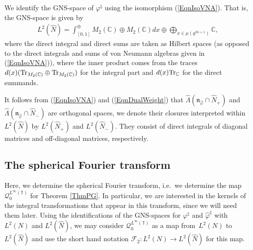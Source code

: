 \documentclass[pdftex]{sigma}
\numberwithin{equation}{section}
\theoremstyle{definition}
\begin{document}
 We identify the GNS-space of $\varphi^\natural$ using the isomorphism (\ref{EqnIsoVNA}). That is, the GNS-space is given by
\begin{gather*}
L^2(\hat{N}) = \int_{[0,1]}^\oplus M_2(\mathbb{C}) \oplus M_2(\mathbb{C})  dx \oplus \bigoplus_{x \in \mu(q^{2\mathbb{N}+1})} \mathbb{C},
\end{gather*}
where the direct integral and direct sums are taken as Hilbert spaces (as opposed to the direct integrals and sums of von Neumann algebras given in (\ref{EqnIsoVNA})), where the inner product comes from the traces $d(x) ( {\rm Tr}_{M_2(\mathbb{C})} \oplus  {\rm Tr}_{M_2(\mathbb{C})}   ) $ for the integral part and $d(x) {\rm Tr}_{\mathbb{C}}$ for the direct summands.

It follows from (\ref{EqnIsoVNA}) and (\ref{EqnDualWeight}) that $\hat{\Lambda}(\mathfrak{n}_{\hat{\varphi}} \cap \hat{N}_+)$ and $\hat{\Lambda}(\mathfrak{n}_{\hat{\varphi}} \cap \hat{N}_-)$  are orthogonal spaces, we denote their closures interpreted within $L^2(\hat{N})$ by $L^2(\hat{N}_+)$ and $L^2(\hat{N}_-)$. They consist of direct integrals of diagonal matrices and of\/f-diagonal matrices, respectively.

\subsection*{The spherical Fourier transform}
Here, we determine the spherical Fourier transform, i.e.\ we determine the map $\mathcal{Q}_0^{L^\infty(\mathbb{T})}$ for Theorem \ref{ThmPG}.
 In particular, we are interested in the kernels of the integral transformations that appear in this transform, since we will need them later. Using the identif\/ications of the GNS-spaces for $\varphi^\natural$ and $\hat{\varphi}^\natural$ with $L^2(N)$ and $L^2(\hat{N})$, we may consider $\mathcal{Q}_0^{L^\infty(\mathbb{T})}$ as a map from~$L^2(N)$ to~$L^2(\hat{N})$ and use the short hand notation $\mathcal{F}_2: L^2(N) \rightarrow L^2(\hat{N})$ for this map.
\end{document}
